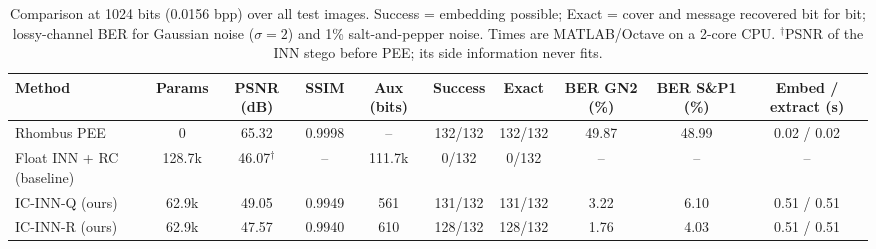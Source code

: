 \begin{table}[t]
\centering
\caption{Comparison at 1024 bits (0.0156 bpp) over all test images. Success = embedding possible; Exact = cover and message recovered bit for bit; lossy-channel BER for Gaussian noise ($\sigma{=}2$) and 1\% salt-and-pepper noise. Times are MATLAB/Octave on a 2-core CPU. $^\dagger$PSNR of the INN stego before PEE; its side information never fits.}
\label{tab:compare}
\setlength{\tabcolsep}{4pt}
\begin{tabular}{lccccccccc}
\toprule
Method & Params & PSNR (dB) & SSIM & Aux (bits) & Success & Exact & BER GN2 (\%) & BER S\&P1 (\%) & Embed / extract (s)\\
\midrule
Rhombus PEE & 0 & 65.32 & 0.9998 & -- & 132/132 & 132/132 & 49.87 & 48.99 & 0.02 / 0.02\\
Float INN + RC (baseline) & 128.7k & 46.07$^\dagger$ & -- & 111.7k & 0/132 & 0/132 & -- & -- & -- \\
IC-INN-Q (ours) & 62.9k & 49.05 & 0.9949 & 561 & 131/132 & 131/132 & 3.22 & 6.10 & 0.51 / 0.51\\
IC-INN-R (ours) & 62.9k & 47.57 & 0.9940 & 610 & 128/132 & 128/132 & 1.76 & 4.03 & 0.51 / 0.51\\
\bottomrule
\end{tabular}
\end{table}
